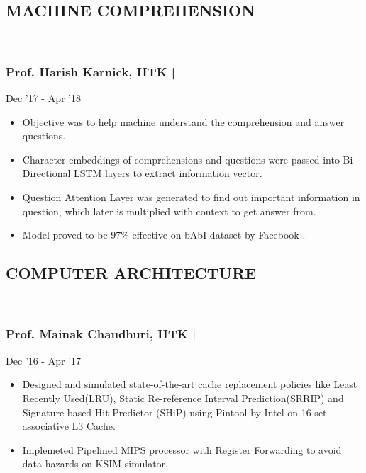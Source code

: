 \documentclass[letterpaper]{twentysecondcv} %
\begin{document}
\subsection{MACHINE COMPREHENSION}\\\hspace{0.7cm}
\subsubsection{Prof. Harish Karnick, IITK | } \hfill{} Dec '17 - Apr '18

\begin{itemize}
\item Objective was to help machine understand the comprehension and answer questions.
\item Character embeddings of comprehensions and questions were passed into Bi-Directional LSTM layers to extract information vector.
\item Question Attention Layer was generated to find out important information in question, which later is multiplied with context to get answer from. 
\item Model proved to be 97\% effective on bAbI dataset by Facebook .
\end{itemize}

\subsection{COMPUTER ARCHITECTURE}\\\hspace{0.7cm}
\subsubsection{Prof. Mainak Chaudhuri, IITK | } \hfill{} Dec '16 - Apr '17

\begin{itemize}
\item Designed and simulated state-of-the-art cache replacement policies like Least Recently Used(LRU), Static Re-reference Interval Prediction(SRRIP) and Signature based Hit Predictor (SHiP) using Pintool by Intel on 16 set-associative L3 Cache.
\item Implemeted Pipelined MIPS processor with Register Forwarding to avoid data hazards on KSIM simulator.
\end{itemize}
\end{document}
